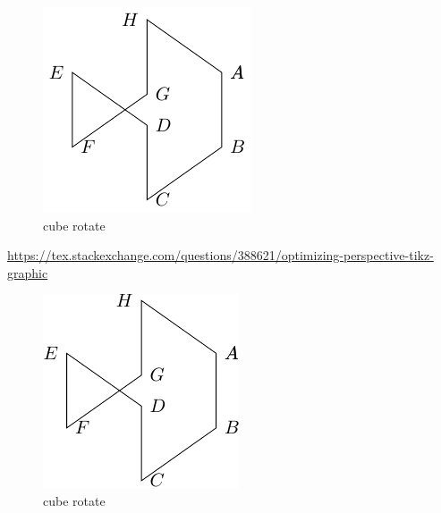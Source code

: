 \documentclass[
]{book}
\theoremstyle{definition}
\theoremstyle{definition}
\theoremstyle{definition}
\theoremstyle{definition}
\theoremstyle{remark}
\begin{document}
\begin{figure}
\includegraphics[width=0.75\linewidth]{202401311000-TikZ_files/figure-latex/unnamed-chunk-63-1} \caption{cube rotate}\label{fig:unnamed-chunk-63}
\end{figure}

\url{https://tex.stackexchange.com/questions/388621/optimizing-perspective-tikz-graphic}

\begin{figure}
\includegraphics[width=0.75\linewidth]{202401311000-TikZ_files/figure-latex/unnamed-chunk-64-1} \caption{cube rotate}\label{fig:unnamed-chunk-64}
\end{figure}
\end{document}
